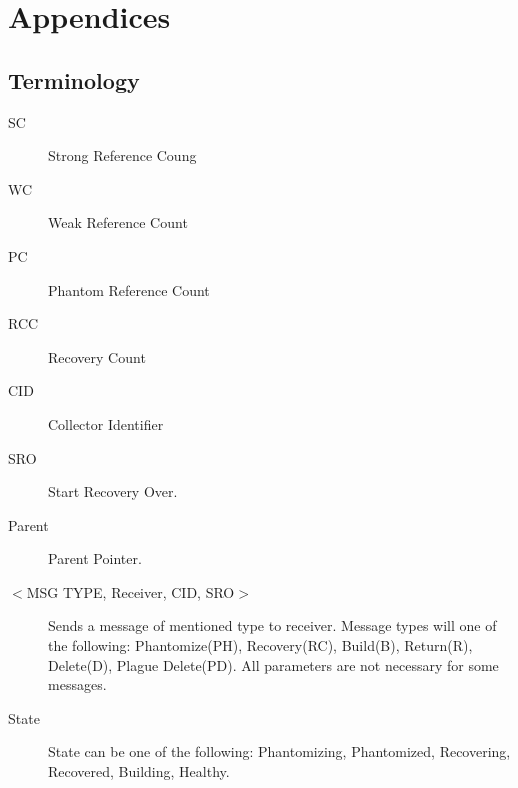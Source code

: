 \section{Appendices}
\label{section:appendix}
\subsection{Terminology}
\begin{description}
\item[SC] Strong Reference Coung
\item[WC] Weak Reference Count

\item[PC] Phantom Reference Count 


 \item[RCC] Recovery Count
\item[CID] Collector Identifier 

\item[SRO] Start Recovery Over. 


\item[Parent] Parent Pointer.

\item[$<$MSG TYPE,  Receiver, CID, SRO$>$] Sends a message of mentioned type to receiver.
Message types will one of the following: 
Phantomize(PH), Recovery(RC), Build(B), Return(R), Delete(D), Plague Delete(PD). All parameters are not necessary for some messages.

\item[State] State can be one of the following: Phantomizing, Phantomized, Recovering, Recovered, Building, Healthy. 
\end{description}
